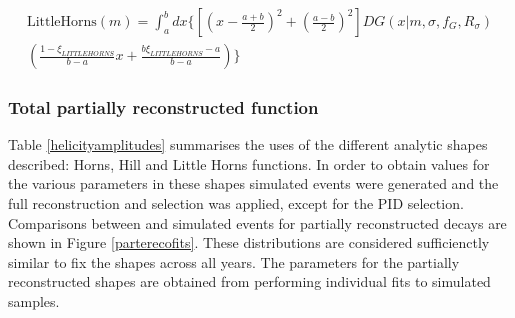\begin{multline}
\text{LittleHorns}(m) = \int_a^b dx \biggl\{ \left[ \left( x - \frac{a+b}{2} \right) ^2 + \left( \frac{a-b}{2} \right) ^2 \right] DG(x|m,\sigma,f_G,R_{\sigma}) \\
\left( \frac{1 - \xi_{LITTLEHORNS}}{b - a}x + \frac{b\xi_{LITTLEHORNS} - a}{b - a} \right) \biggr\}
\label{eqn:littlehorns}
\end{multline}

\subsubsection{Total partially reconstructed function}

Table \ref{helicityamplitudes} summarises the uses of the different analytic shapes described: Horns, Hill and Little Horns functions. In order to obtain values for the various parameters in these shapes simulated events were generated and the full reconstruction and selection was applied, except for the PID selection. Comparisons between \runone and \runtwo simulated events for partially reconstructed decays are shown in Figure \ref{parterecofits}. These distributions are considered sufficienctly similar to fix the shapes across all years. The parameters for the partially reconstructed shapes are obtained from performing individual fits to \runone simulated samples.

